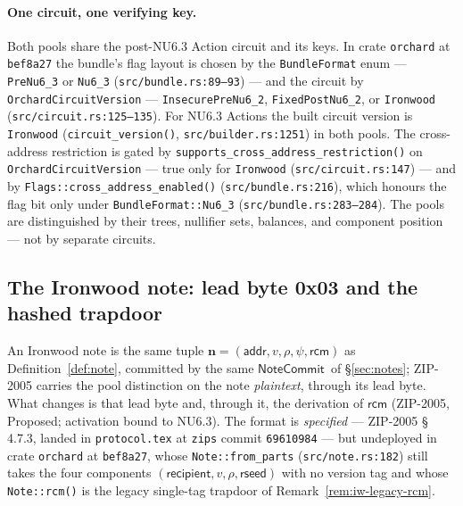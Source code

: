 \documentclass[11pt,a4paper]{article}
\theoremstyle{definition}
\newcommand{\NoteCommit}{\ensuremath{\mathsf{NoteCommit}}}
\newcommand{\rcm}{\ensuremath{\mathsf{rcm}}}
\begin{document}
\paragraph{One circuit, one verifying key.} Both pools share the post-NU6.3
Action circuit and its keys. In crate \texttt{orchard} at \texttt{bef8a27} the
bundle's flag layout is chosen by the \texttt{BundleFormat} enum ---
\texttt{PreNu6\_3} or \texttt{Nu6\_3} (\texttt{src/bundle.rs:89--93}) --- and
the circuit by \texttt{OrchardCircuitVersion} --- \texttt{InsecurePreNu6\_2},
\texttt{FixedPostNu6\_2}, or \texttt{Ironwood}
(\texttt{src/circuit.rs:125--135}). For NU6.3 Actions the built circuit
version is \texttt{Ironwood} (\texttt{circuit\_version()},
\texttt{src/builder.rs:1251}) in both pools. The cross-address restriction is
gated by \texttt{supports\_cross\_address\_restriction()} on
\texttt{OrchardCircuitVersion} --- true only for \texttt{Ironwood}
(\texttt{src/circuit.rs:147}) --- and by \texttt{Flags::cross\_address\_enabled()}
(\texttt{src/bundle.rs:216}), which honours the flag bit only under
\texttt{BundleFormat::Nu6\_3} (\texttt{src/bundle.rs:283--284}). The pools are
distinguished by their trees, nullifier sets, balances, and component
position --- not by separate circuits.

\subsection{The Ironwood note: lead byte 0x03 and the hashed
trapdoor}\label{sec:iw-note}

An Ironwood note is the same tuple $\mathbf{n} = (\mathsf{addr}, v, \rho,
\psi, \rcm)$ as Definition~\ref{def:note}, committed by the same
\NoteCommit\ of \S\ref{sec:notes}; ZIP-2005 carries the pool distinction on
the note \emph{plaintext}, through its lead byte. What changes is that lead
byte and, through it, the derivation of $\rcm$ (ZIP-2005, Proposed;
activation bound to NU6.3). The format is \emph{specified} --- ZIP-2005
\S\,4.7.3, landed in \texttt{protocol.tex} at \texttt{zips} commit
\texttt{69610984} --- but undeployed in crate \texttt{orchard} at
\texttt{bef8a27}, whose \texttt{Note::from\_parts} (\texttt{src/note.rs:182})
still takes the four components $(\mathsf{recipient}, v, \rho,
\mathsf{rseed})$ with no version tag and whose \texttt{Note::rcm()} is the
legacy single-tag trapdoor of Remark~\ref{rem:iw-legacy-rcm}.
\end{document}

